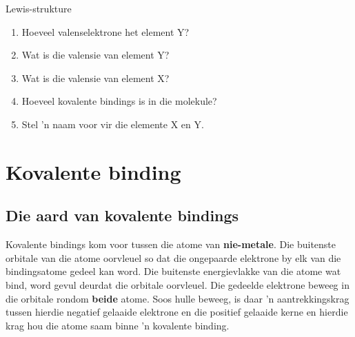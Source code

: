 \begin{exercises}{Lewis-strukture}
{\begin{enumerate}[noitemsep, label=\textbf{\arabic*}. ]
    \setcounter{subfigure}{0}
	\begin{figure}[H] %
\begin{center}
\end{center}
 \end{figure}       \label{m38701*id141181}\begin{enumerate}[noitemsep, label=\textbf{\alph*}. ] 
            \label{m38701*uid39}\item Hoeveel valenselektrone het element $\text{Y}$?
\label{m38701*uid40}\item Wat is die valensie van element $\text{Y}$?
\label{m38701*uid41}\item Wat is die valensie van element $\text{X}$?
\label{m38701*uid42}\item Hoeveel kovalente bindings is in die molekule?
\label{m38701*uid43}\item Stel 'n naam voor vir die elemente $\text{X}$ en $\text{Y}$.
\end{enumerate}
                \end{enumerate}

}
\end{exercises}


            \section{Kovalente binding}
            \nopagebreak
            \label{m38704*uid6}
            \subsection*{Die aard van kovalente bindings}
            \nopagebreak
        \label{m38704*id138956}
Kovalente bindings kom voor tussen die atome van \textbf{nie-metale}. Die buitenste orbitale van die atome oorvleuel so dat die ongepaarde elektrone by elk van die bindingsatome gedeel kan word. Die buitenste energievlakke van die atome wat bind, word gevul deurdat die orbitale oorvleuel. Die gedeelde elektrone beweeg in die orbitale rondom \textbf{beide} atome. Soos hulle beweeg, is daar 'n aantrekkingskrag tussen hierdie negatief gelaaide elektrone en die positief gelaaide kerne en hierdie krag hou die atome saam binne 'n kovalente binding.\par 

